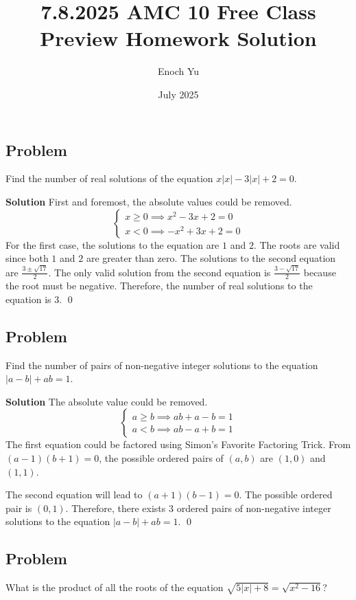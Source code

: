 \documentclass{article}
\title{7.8.2025 AMC 10 Free Class Preview Homework Solution}
\author{Enoch Yu}
\date{July 2025}
\newenvironment{solution}{\begin{trivlist}\item[]{\bf Solution}}{\qed \end{trivlist}}
\begin{document}
\maketitle

\subsection*{Problem}
Find the number of real solutions of the equation
$x|x|- 3|x| + 2 = 0$.
\begin{solution}
First and foremost, the absolute values could be removed.
\[
\begin{cases}
    x \ge 0 \implies x^2 - 3x + 2 = 0 \\
    x < 0 \implies -x^2 + 3x + 2 = 0
\end{cases}
\]
For the first case, the solutions to the equation are
$1$ and $2$. The roots are valid since both $1$ and $2$
are greater than zero. The solutions to the second equation
are $\frac{3 \pm \sqrt{17}}{2}$. The only valid solution
from the second equation is $\frac{3 - \sqrt{17}}{2}$
because the root must be negative. Therefore, the number
of real solutions to the equation is $\boxed{3}$.
\end{solution}

\subsection*{Problem}
Find the number of pairs of non-negative integer solutions
to the equation $|a - b| + ab = 1$.
\begin{solution}
The absolute value could be removed.
\[
\begin{cases}
    a \ge b \implies ab + a - b = 1 \\
    a < b \implies ab - a + b = 1
\end{cases}
\]
The first equation could be factored using Simon's Favorite
Factoring Trick. From $(a - 1)(b + 1) = 0$, the possible
ordered pairs of $(a, b)$ are $(1, 0)$ and $(1, 1)$.

The second equation will lead to $(a + 1)(b - 1) = 0$.
The possible ordered pair is $(0, 1)$. Therefore, there
exists $\boxed{3}$ ordered pairs of non-negative integer
solutions to the equation $|a - b| + ab = 1$.
\end{solution}

\subsection*{Problem}
What is the product of all the roots of the equation
$\sqrt{5|x| + 8} = \sqrt{x^2 - 16}$?
\end{document}
